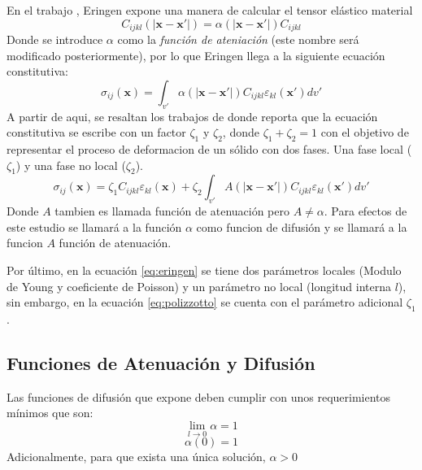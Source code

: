En el trabajo , Eringen expone una manera de calcular el tensor elástico material
\begin{equation}
	C_{ijkl}(|\boldsymbol{x}-\boldsymbol{x'}|)=\alpha(|\boldsymbol{x}-\boldsymbol{x'}|)C_{ijkl}
\end{equation}
Donde se introduce $\alpha$ como la \textit{función de ateniación} (este nombre será modificado posteriormente), por lo que Eringen llega a la siguiente ecuación constitutiva:
\begin{equation}
	\sigma_{ij}(\boldsymbol{x})=\int_{v'}\alpha(|\boldsymbol{x}-\boldsymbol{x'}|)C_{ijkl}\varepsilon_{kl}(\boldsymbol{x'})dv'
	\label{eq:eringen}
\end{equation}
A partir de aqui, se resaltan los trabajos de \textcite{Polizzotto2001} donde reporta que la ecuación constitutiva se escribe con un factor $\zeta_1$ y $\zeta_2$, donde $\zeta_1+\zeta_2=1$ con el objetivo de representar el proceso de deformacion de un sólido con dos fases. Una fase local ($\zeta_1$) y una fase no local ($\zeta_2$).
\begin{equation}
	\sigma_{ij}(\boldsymbol{x})=\zeta_1C_{ijkl}\varepsilon_{kl}(\boldsymbol{x})+\zeta_2\int_{v'}A(|\boldsymbol{x}-\boldsymbol{x'}|)C_{ijkl}\varepsilon_{kl}(\boldsymbol{x'})dv'
	\label{eq:polizzotto}
\end{equation}
Donde $A$ tambien es llamada función de atenuación pero $A\neq\alpha$.
Para efectos de este estudio se llamará a la función $\alpha$ como funcion de difusión y se llamará a la funcion $A$ función de atenuación.

Por último, en la ecuación \ref{eq:eringen} se tiene dos parámetros locales (Modulo de Young y coeficiente de Poisson) y un parámetro no local (longitud interna $l$), sin embargo, en la ecuación \ref{eq:polizzotto} se cuenta con el parámetro adicional $\zeta_1$.
\subsection{Funciones de Atenuación y Difusión}

Las funciones de difusión que expone \textcite{Eringen1987} deben cumplir con unos requerimientos mínimos que son:
\begin{equation}
	\lim_{l\to0}\alpha=1
\end{equation}
\begin{equation}
	\alpha(0)=1
\end{equation}
Adicionalmente, para que exista una única solución, $\alpha>0$ \parencite{ALTAN19891271} 

